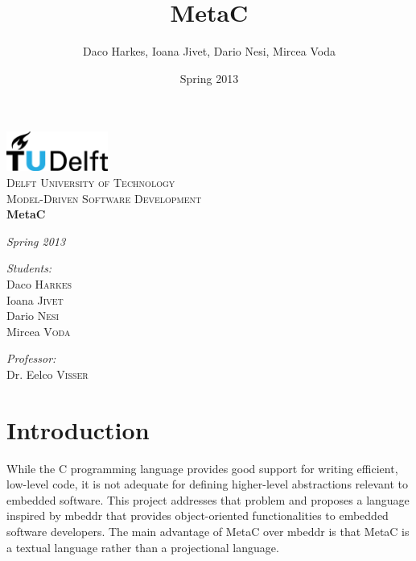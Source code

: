 \documentclass[a4paper,10pt,titlepage]{report}
\title{MetaC}
\author{Daco Harkes, Ioana Jivet, Dario Nesi, Mircea Voda}
\date{Spring 2013}
\begin{document}
\begin{titlepage}
\begin{center}


\includegraphics[width=0.25\textwidth]{pics/logo.eps}~\\[1cm]

\textsc{\LARGE Delft University of Technology}\\[4.5cm]

\textsc{\Large Model-Driven Software Development}\\[1cm]

{ \Huge \bfseries{MetaC}\\[1.5cm]}

\emph{Spring 2013}\\[4cm]

\begin{minipage}{0.4\textwidth}
\begin{flushleft} \large
\emph{Students:}\\
Daco \textsc{Harkes}\\
Ioana \textsc{Jivet}\\
Dario \textsc{Nesi}\\
Mircea \textsc{Voda}\\
\end{flushleft}
\end{minipage}
\begin{minipage}{0.4\textwidth}
\begin{flushright} \large
\emph{Professor:} \\
Dr. Eelco \textsc{Visser}
\end{flushright}
\end{minipage}

\vfill

\end{center}
\end{titlepage}



\chapter{Introduction}

While the C programming language provides good support for writing efficient, low-level code, it is not adequate for defining higher-level abstractions relevant to embedded software. This project addresses that problem and proposes a language inspired by mbeddr \cite{voelter2012mbeddr} that provides object-oriented functionalities to embedded software developers. The main advantage of MetaC over mbeddr is that MetaC is a textual language rather than a projectional language.
\end{document}
